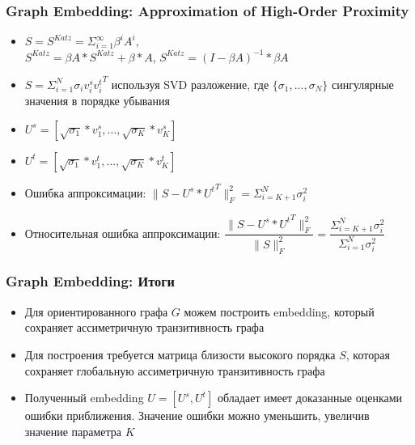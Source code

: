 \documentclass[xcolor=table,english]{beamer}
\begin{document}
\begin{frame}[fragile] \frametitle{Graph Embedding: Approximation of High-Order Proximity}
    \begin{itemize}
        \item $S = S^{Katz} = \Sigma_{i=1}^{\infty} \beta^i A^i$, \\$S^{Katz} = \beta A * S^{Katz} + \beta * A$, $S^{Katz} = (I - \beta A)^{-1} * \beta A$
        \item $S = \Sigma_{i=1}^N \sigma_i v_i^s {v_i^t}^T$ используя SVD разложение, где $\{\sigma_1, ... , \sigma_N\}$ сингулярные значения в порядке убывания
        \item $U^s = [ \sqrt{\sigma_1} * v_1^s, ..., \sqrt{\sigma_K} * v_K^s ]$
        \item $U^t = [ \sqrt{\sigma_1} * v_1^t, ..., \sqrt{\sigma_K} * v_K^t ]$
        \item Ошибка аппроксимации: $\| S - U^s * {U^t}^T \|^2_F = \Sigma_{i=K+1}^N \sigma_i^2$
        \item Относительная ошибка аппроксимации: $\dfrac{\| S - U^s * {U^t}^T \|^2_F}{\| S \|^2_F} = \dfrac{\Sigma_{i=K+1}^N \sigma_i^2}{\Sigma_{i=1}^N \sigma_i^2}$
    \end{itemize}
\end{frame}

\begin{frame}[fragile] \frametitle{Graph Embedding: Итоги}
    \begin{itemize}
        \item Для ориентированного графа $G$ можем построить embedding, который сохраняет ассиметричную транзитивность графа
        \item Для построения требуется матрица близости высокого порядка $S$, которая сохраняет 
        глобальную ассиметричную транзитивность графа
        \item Полученный embedding $U = [U^s, U^t]$ обладает имеет доказанные оценками ошибки приближения. Значение ошибки можно уменьшить, увеличив значение параметра $K$
    \end{itemize}
\end{frame}
\end{document}
